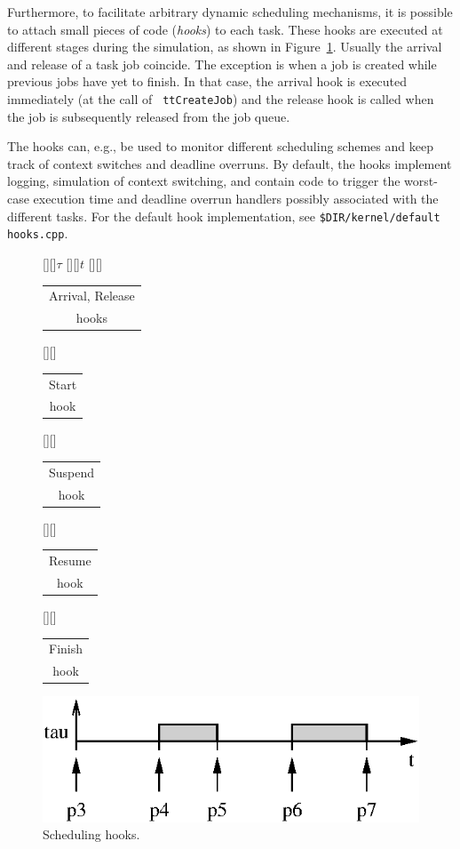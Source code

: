 \documentclass[final,twoside]{rapport}
\begin{document}
Furthermore, to facilitate arbitrary dynamic scheduling mechanisms, it
is possible to attach small pieces of code (\textit{hooks}) to each
task. These hooks are executed at different stages during the
simulation, as shown in Figure~\ref{fig:hooks}. Usually the arrival
and release of a task job coincide. The exception is when a job is
created while previous jobs have yet to finish. In that case, the
arrival hook is executed immediately (at the call of {\tt
  ttCreateJob}) and the release hook is called when the job is
subsequently released from the job queue.

The hooks can, e.g., be used to monitor different scheduling schemes
and keep track of context switches and deadline overruns. By default,
the hooks implement logging, simulation of context switching, and
contain code to trigger the worst-case execution time and deadline
overrun handlers possibly associated with the different tasks. For the
default hook implementation, see
\texttt{\$DIR/kernel/default} \texttt{hooks.cpp}.

\begin{figure}[tbp]
  \center
  [][]{$\tau$}
  [][]{$t$}
  \small
  [][]{\begin{tabular}{c}Arrival, Release\\[-0.3em]hooks\end{tabular}}
  [][]{\begin{tabular}{c}Start\\[-0.3em]hook\end{tabular}}
  [][]{\begin{tabular}{c}Suspend\\[-0.3em]hook\end{tabular}}
  [][]{\begin{tabular}{c}Resume\\[-0.3em]hook\end{tabular}}
  [][]{\begin{tabular}{c}Finish\\[-0.3em]hook\end{tabular}}

  \includegraphics[scale=1.6]{hooks.eps}
  \caption{Scheduling hooks.}
  \label{fig:hooks}
\end{figure}
\vspace{2em}
\end{document}
